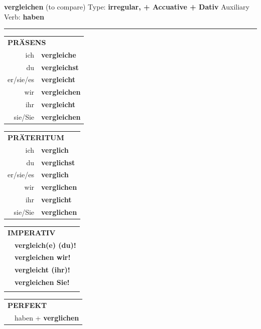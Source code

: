 \documentclass[10pt,a4paper]{revtex4-2}
\begin{document}
\begin{verbbox-dat}
    {\Large \bf vergleichen} (to compare) \hfill Type: \textbf{irregular, + Accuative + Dativ} \hfill Auxiliary Verb: \textbf{haben} 
    
     \vspace{5pt}

    \hrule
    
    \vspace{5pt}

  \begin{tabular}{rl}
     \multicolumn{2}{l}{\textbf{PRÄSENS} }\\
    ich & \textbf{vergleiche}\\
    du & \textbf{vergleichst}\\
    er/sie/es & \textbf{vergleicht}\\
    wir & \textbf{vergleichen}\\
    ihr & \textbf{vergleicht}\\
    sie/Sie & \textbf{vergleichen}\\
  \end{tabular}
  \hfill
     \begin{tabular}{rl}
    \multicolumn{2}{l}{\textbf{PRÄTERITUM} }\\
    ich & \textbf{verglich}\\
    du & \textbf{verglichst}\\
    er/sie/es & \textbf{verglich}\\
    wir & \textbf{verglichen}\\
    ihr & \textbf{verglicht}\\
    sie/Sie & \textbf{verglichen}\\
  \end{tabular}
  \hfill
  \begin{tabular}{rl}
     \multicolumn{2}{l}{\textbf{IMPERATIV} }\\
   & \textbf{vergleich(e) (du)!}\\
   & \textbf{vergleichen wir!}\\
   & \textbf{vergleicht (ihr)!}\\
   & \textbf{vergleichen Sie!}\\
   & \vspace{10pt}
  \end{tabular}

    \vspace{10pt}

 \begin{tabular}{rl}
     \multicolumn{2}{l}{\textbf{PERFEKT}}\\
  &  haben + \textbf{verglichen}\\
  \end{tabular}
\hfill
   \begin{tabular}{rl}
   

\end{tabular}
\end{verbbox-dat}
\end{document}
